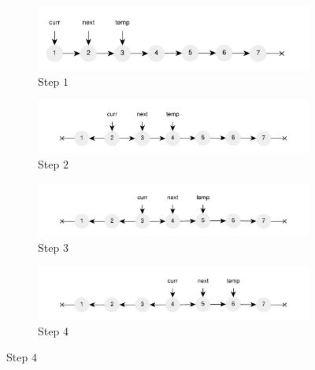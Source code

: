 \begin{figure}
	\vspace*{-0.5in}
	\centering
	\begin{subfigure}[t]{0.49\textwidth}
		\centering
		\includegraphics[width=\textwidth]{sources/list_reverse/images/list_reverse_iterative1}
		\caption[]{Step $1$}
		\label{fig:list_reverse:list_reverse_iterative1}
	 \end{subfigure}
	\hfill
	\begin{subfigure}[t]{0.49\textwidth}
		\centering
		\includegraphics[width=\textwidth]{sources/list_reverse/images/list_reverse_iterative2}
		\caption[]{Step $2$}
		\label{fig:list_reverse:list_reverse_iterative2}
	 \end{subfigure}
	 \hfill
	 \begin{subfigure}[t]{0.49\textwidth}
		\centering
		\includegraphics[width=\textwidth]{sources/list_reverse/images/list_reverse_iterative3}
		\caption[]{Step $3$}
		\label{fig:list_reverse:list_reverse_iterative3}
	 \end{subfigure}
	 \hfill
	 \begin{subfigure}[t]{0.49\textwidth}
		\centering
		\includegraphics[width=\textwidth]{sources/list_reverse/images/list_reverse_iterative4}
		\caption[]{Step $4$}
		\label{fig:list_reverse:list_reverse_iterative4}

\end{subfigure}
\end{figure}
